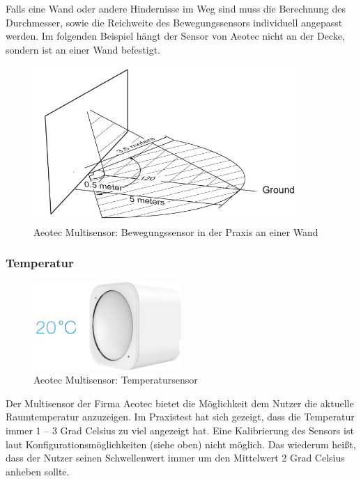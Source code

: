 Falls eine Wand oder andere Hindernisse im Weg sind muss die Berechnung des Durchmesser, sowie die Reichweite des Bewegungssensors individuell angepasst werden. Im folgenden Beispiel hängt der Sensor von Aeotec nicht an der Decke, sondern ist an einer Wand befestigt.

\begin{figure}[h!]
	\centering
	\includegraphics[width=0.9\textwidth]{img/Sensorevaluation/AeoMeter2.png}
	\caption{Aeotec Multisensor: Bewegungssensor in der Praxis an einer Wand}
	\label{fig:sensorenAeoMeter2}
\end{figure}

\subsubsection{Temperatur}
\begin{figure}[h!]
	\centering
	\includegraphics[width=0.5\textwidth]{img/Sensorevaluation/AeoTemp.png}
	\caption{Aeotec Multisensor: Temperatursensor}
	\label{fig:sensorenAeoTemp}
\end{figure}

Der Multisensor der Firma Aeotec bietet die Möglichkeit dem Nutzer die aktuelle Raumtemperatur anzuzeigen. Im Praxistest hat sich gezeigt, dass die Temperatur immer 1 – 3 Grad Celsius zu viel angezeigt hat. Eine Kalibrierung des Sensors ist laut Konfigurationsmöglichkeiten (siehe oben) nicht möglich. Das wiederum heißt, dass der Nutzer seinen Schwellenwert immer um den Mittelwert 2 Grad Celsius anheben sollte.

